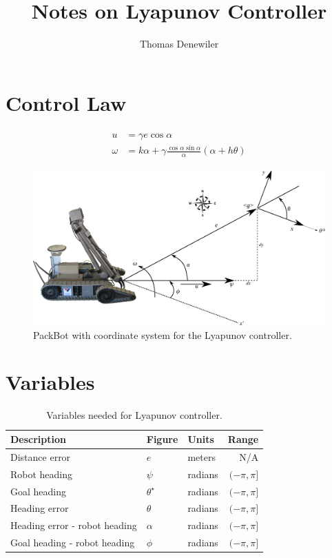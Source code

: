 \documentclass[12pt]{article}
\begin{document}
\title{Notes on Lyapunov Controller}
\author{Thomas Denewiler}
\maketitle

\section{Control Law}
\begin{align}
\label{eq:lyapunovControlLaw}
\begin{split}
u &= \gamma e\cos\alpha \\
\omega &= k\alpha + \gamma\frac{\cos\alpha\sin\alpha}{\alpha}\left(\alpha+h\theta\right)
\end{split}
\end{align}

\begin{figure}[ht!]
	\centering
	\includegraphics[width=.95\textwidth]{images/packbotlyapunov}
	\caption{PackBot with coordinate system for the Lyapunov controller.}
	\label{fig:pblyapunov}
\end{figure}

\section{Variables}
\begin{table}[ht!]
\caption{Variables needed for Lyapunov controller.}
\small
\centering
\begin{tabular}{@{}lllr@{}} \toprule
Description                   & Figure         & Units   & Range \\ \midrule
Distance error                & $e$            & meters  & N/A \\
Robot heading                 & $\psi$         & radians & $(-\pi,\pi]$ \\
Goal heading                  & $\theta^\star$ & radians & $(-\pi,\pi]$ \\
Heading error                 & $\theta$       & radians & $(-\pi,\pi]$ \\
Heading error - robot heading & $\alpha$       & radians & $(-\pi,\pi]$ \\
Goal heading - robot heading  & $\phi$         & radians & $(-\pi,\pi]$ \\ \bottomrule
\end{tabular}
\label{tab:LyapunovVariables}
\end{table}
\end{document}
